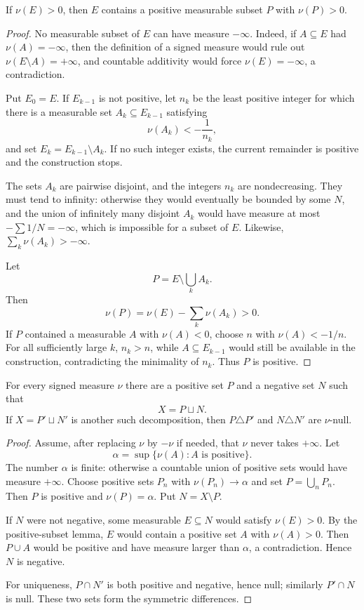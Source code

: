 \begin{lem}
If $\nu(E)>0$, then $E$ contains a positive measurable subset $P$ with $\nu(P)>0$.
\end{lem}

\begin{proof}
No measurable subset of $E$ can have measure $-\infty$. Indeed, if $A\subseteq E$ had $\nu(A)=-\infty$, then the definition of a signed measure would rule out $\nu(E\setminus A)=+\infty$, and countable additivity would force $\nu(E)=-\infty$, a contradiction.

Put $E_0=E$. If $E_{k-1}$ is not positive, let $n_k$ be the least positive integer for which there is a measurable set $A_k\subseteq E_{k-1}$ satisfying
\[
\nu(A_k)<-\frac1{n_k},
\]
and set $E_k=E_{k-1}\setminus A_k$. If no such integer exists, the current remainder is positive and the construction stops.

The sets $A_k$ are pairwise disjoint, and the integers $n_k$ are nondecreasing. They must tend to infinity: otherwise they would eventually be bounded by some $N$, and the union of infinitely many disjoint $A_k$ would have measure at most $-\sum 1/N=-\infty$, which is impossible for a subset of $E$. Likewise, $\sum_k\nu(A_k)>-\infty$.

Let
\[
P=E\setminus\bigcup_kA_k.
\]
Then
\[
\nu(P)=\nu(E)-\sum_k\nu(A_k)>0.
\]
If $P$ contained a measurable $A$ with $\nu(A)<0$, choose $n$ with $\nu(A)<-1/n$. For all sufficiently large $k$, $n_k>n$, while $A\subseteq E_{k-1}$ would still be available in the construction, contradicting the minimality of $n_k$. Thus $P$ is positive.
\end{proof}

\begin{thm}
For every signed measure $\nu$ there are a positive set $P$ and a negative set $N$ such that
\[
X=P\sqcup N.
\]
If $X=P'\sqcup N'$ is another such decomposition, then $P\triangle P'$ and $N\triangle N'$ are $\nu$-null.
\end{thm}

\begin{proof}
Assume, after replacing $\nu$ by $-\nu$ if needed, that $\nu$ never takes $+\infty$. Let
\[
\alpha=\sup\{\nu(A):A\text{ is positive}\}.
\]
The number $\alpha$ is finite: otherwise a countable union of positive sets would have measure $+\infty$. Choose positive sets $P_n$ with $\nu(P_n)\to\alpha$ and set $P=\bigcup_nP_n$. Then $P$ is positive and $\nu(P)=\alpha$. Put $N=X\setminus P$.

If $N$ were not negative, some measurable $E\subseteq N$ would satisfy $\nu(E)>0$. By the positive-subset lemma, $E$ would contain a positive set $A$ with $\nu(A)>0$. Then $P\cup A$ would be positive and have measure larger than $\alpha$, a contradiction. Hence $N$ is negative.

For uniqueness, $P\cap N'$ is both positive and negative, hence null; similarly $P'\cap N$ is null. These two sets form the symmetric differences.
\end{proof}

